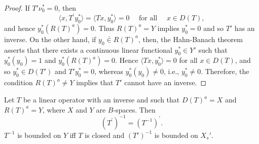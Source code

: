 \begin{proof}
If $T' \nu_0^* = 0$, then 
\[
\langle x, T ^{\prime} y _{0} ^{*} \rangle = \langle T x, y _{0} ^{*} \rangle = 0 \quad \text{ for all } \quad x \in D (T),
\]
and hence $y_0^*(R(T)^a) = 0$. Thus $R(T)^a = Y$ implies $y_0^* = 0$ and so $T'$ has an inverse. On the other hand, if $y_0 \bar{\in} R(T)^a$, then, the Hahn-Banach theorem asserts that there exists a continuous linear functional $y_0^* \in Y'$ such that $y_0^*(y_0) = 1$ and $y_0^*(R(T)^a) = 0$. Hence $\langle Tx, y_0^* \rangle = 0$ for all $x \in D(T)$, and so $y_0^* \in D(T')$ and $T'y_0^* = 0$, whereas $y_0^*(y_0) \neq 0$, i.e., $y_0^* \neq 0$. Therefore, the condition $R(T)^a \neq Y$ implies that $T'$ cannot have an inverse. 
\end{proof}

\begin{theorem}\label{thm:VIII.6.Theorem.1} Let $T$ be a linear operator with an inverse and such that $D(T)^{a} = X$ and $R(T)^{a} = Y$, where $X$ and $Y$ are $B$-spaces. Then 
\begin{equation}\label{eq:VIII.6.1}
(T ^{\prime}) ^{-1} = (T ^{-1}) ^{\prime}.
\end{equation}
$T^{-1}$ is bounded on $Y$ iff $T$ is closed and $(T')^{-1}$ is bounded on $X_s'$. 
\end{theorem}

